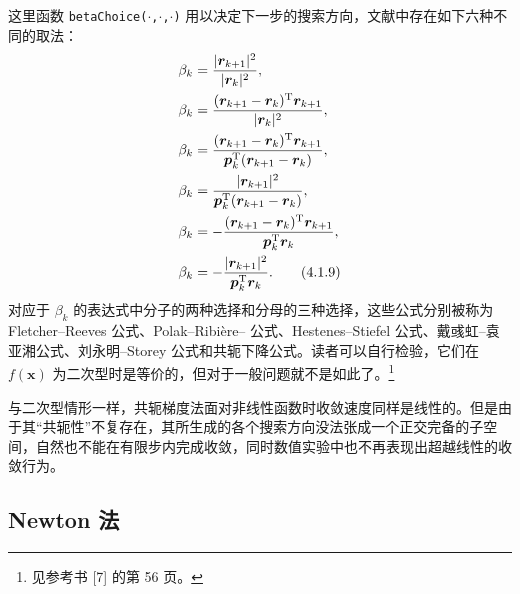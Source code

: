 这里函数 \texttt{betaChoice($\cdot$,$\cdot$,$\cdot$)} 用以决定下一步的搜索方向，文献中存在如下六种不同的取法：
\begin{align}
\beta_k&=\frac{\lvert\bm r_{k+1}\rvert^2}{\lvert\bm r_k\rvert^2},\notag\\
\beta_k&=\frac{(\bm r_{k+1}-\bm r_k)^{\mathrm T}\bm r_{k+1}}{\lvert\bm r_k\rvert^2},\notag\\
\beta_k&=\frac{(\bm r_{k+1}-\bm r_k)^{\mathrm T}\bm r_{k+1}}{\bm p_k^{\mathrm T}(\bm r_{k+1}-\bm r_k)},\notag\\
\beta_k&=\frac{\lvert\bm r_{k+1}\rvert^2}{\bm p_k^{\mathrm T}(\bm r_{k+1}-\bm r_k)},\notag\\
\beta_k&=-\frac{(\bm r_{k+1}-\bm r_k)^{\mathrm T}\bm r_{k+1}}{\bm p_k^{\mathrm T}\bm r_k},\notag\\
\beta_k&=-\frac{\lvert\bm r_{k+1}\rvert^2}{\bm p_k^{\mathrm T}\bm r_k}.
\tag{4.1.9}
\end{align}
对应于 $\beta_k$ 的表达式中分子的两种选择和分母的三种选择，这些公式分别被称为 Fletcher--Reeves 公式、Polak--Ribière-- 公式、Hestenes--Stiefel 公式、戴彧虹--袁亚湘公式、刘永明--Storey 公式和共轭下降公式。读者可以自行检验，它们在 $f(\bm x)$ 为二次型时是等价的，但对于一般问题就不是如此了。\footnote{见参考书 [7] 的第 56 页。}

与二次型情形一样，共轭梯度法面对非线性函数时收敛速度同样是线性的。但是由于其“共轭性”不复存在，其所生成的各个搜索方向没法张成一个正交完备的子空间，自然也不能在有限步内完成收敛，同时数值实验中也不再表现出超越线性的收敛行为。

\subsection{Newton 法}

